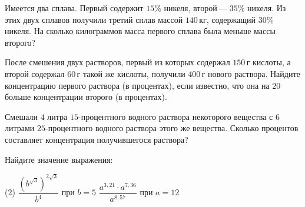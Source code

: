\begin{class}[number=8]
\begin{listofex}
		\item Имеется два сплава. Первый содержит \(15\%\) никеля, второй --- \(35\%\) никеля. Из этих двух сплавов получили третий сплав массой \(140\) кг, содержащий \(30\%\) никеля. На сколько килограммов масса первого сплава была меньше массы второго?
		\item После смешения двух растворов, первый из которых содержал \(150\) г кислоты, а второй содержал \(60\) г такой же кислоты, получили \(400\) г нового раствора. Найдите концентрацию первого раствора (в процентах), если известно, что она на \(20\) больше концентрации второго (в процентах).
		
		\item Смешали \(4\) литра \(15\)-процентного водного раствора некоторого вещества с \(6\) литрами \(25\)-процентного водного раствора этого же вещества. Сколько процентов составляет концентрация получившегося раствора?
		\item Найдите значение выражения:
		\begin{tasks}(2)
			\task \( \dfrac{ (b^{\sqrt{3}})^{2\sqrt{3}} }{ b^4 } \) при \(b=5\)
			\task \( \dfrac{ a^{3,21} \cdot a^{7,36} }{ a^{8,57} } \) при \(a=12\)
		\end{tasks}
	\end{listofex}
\end{class}
